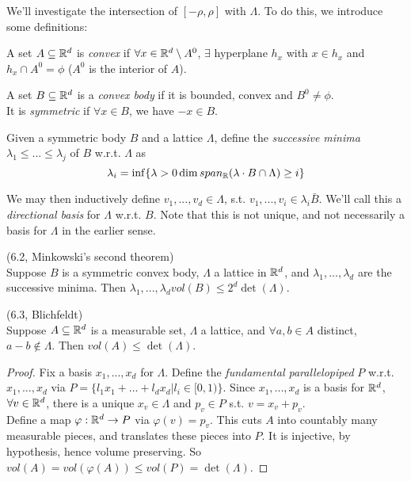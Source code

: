 \documentclass[a4paper]{article}
\begin{document}
We'll investigate the intersection of $[-\rho,\rho]$ with $\Lambda$. To do this, we introduce some definitions:

\begin{defi}
    A set $A \subseteq \mathbb{R}^d$ is \emph{convex} if $\forall x \in \mathbb{R}^d \setminus A^0$, $\exists$ hyperplane $h_x$ with $x \in h_x$ and $h_x \cap A^0 = \phi$ ($A^0$ is the interior of $A$).
\end{defi}

\begin{defi}
    A set $B \subseteq \mathbb{R}^d$ is a \emph{convex body} if it is bounded, convex and $B^0 \neq \phi$.\\
    It is \emph{symmetric} if $\forall x \in B$, we have $-x \in B$.
\end{defi}

Given a symmetric body $B$ and a lattice $\Lambda$, define the \emph{successive minima} $\lambda_1 \leq ... \leq \lambda_j$ of $B$ w.r.t. $\Lambda$ as
\[
    \lambda_i = \inf \{\lambda>0 \dim span_{\mathbb{R}}(\lambda \cdot B \cap \Lambda) \geq i\}
\]

We may then inductively define $v_1,...,v_d \in \Lambda$, s.t. $v_1,...,v_i \in \lambda_i \bar{B}$. We'll call this a \emph{directional basis} for $\Lambda$ w.r.t. $B$. Note that this is not unique, and not necessarily a basis for $\Lambda$ in the earlier sense.

\begin{thm} (6.2, Minkowski's second theorem)\\
    Suppose $B$ is a symmetric convex body, $\Lambda$ a lattice in $\mathbb{R}^d$, and $\lambda_1,...,\lambda_d$ are the successive minima. Then $\lambda_1,...,\lambda_d vol(B) \leq 2^d \det(\Lambda)$.
\end{thm}

\begin{lemma} (6.3, Blichfeldt)\\
    Suppose $A \subseteq \mathbb{R}^d$ is a measurable set, $\Lambda$ a lattice, and $\forall a,b \in A$ distinct, $a-b \not\in \Lambda$. Then $vol(A) \leq \det(\Lambda)$.
    \begin{proof}
        Fix a basis $x_1,...,x_d$ for $\Lambda$. Define the \emph{fundamental parallelopiped} $P$ w.r.t. $x_1,...,x_d$ via $P=\{l_1x_1+...+l_dx_d | l_i \in [0,1)\}$. Since $x_1,...,x_d$ is a basis for $\mathbb{R}^d$, $\forall v \in \mathbb{R}^d$, there is a unique $x_v \in \Lambda$ and $p_v \in P$ s.t. $v = x_v + p_v$.\\
        Define a map $\varphi: \mathbb{R}^d \to P$ via $\varphi(v) = p_v$. This cuts $A$ into countably many measurable pieces, and translates these pieces into $P$. It is injective, by hypothesis, hence volume preserving. So $vol(A) = vol(\varphi(A)) \leq vol(P) = \det(\Lambda)$.
    \end{proof}
\end{lemma}
\end{document}
